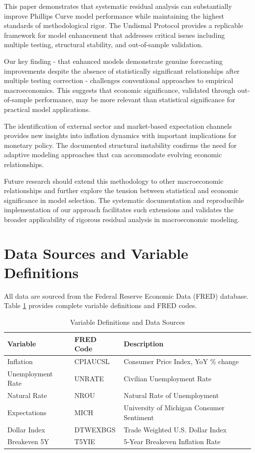 \documentclass[12pt]{article}
\begin{document}
This paper demonstrates that systematic residual analysis can substantially improve Phillips Curve model performance while maintaining the highest standards of methodological rigor. The Undismal Protocol provides a replicable framework for model enhancement that addresses critical issues including multiple testing, structural stability, and out-of-sample validation.

Our key finding - that enhanced models demonstrate genuine forecasting improvements despite the absence of statistically significant relationships after multiple testing correction - challenges conventional approaches to empirical macroeconomics. This suggests that economic significance, validated through out-of-sample performance, may be more relevant than statistical significance for practical model applications.

The identification of external sector and market-based expectation channels provides new insights into inflation dynamics with important implications for monetary policy. The documented structural instability confirms the need for adaptive modeling approaches that can accommodate evolving economic relationships.

Future research should extend this methodology to other macroeconomic relationships and further explore the tension between statistical and economic significance in model selection. The systematic documentation and reproducible implementation of our approach facilitates such extensions and validates the broader applicability of rigorous residual analysis in macroeconomic modeling.




\appendix

\section{Data Sources and Variable Definitions}

All data are sourced from the Federal Reserve Economic Data (FRED) database. Table \ref{tab:variables} provides complete variable definitions and FRED codes.

\begin{table}[H]
\centering
\caption{Variable Definitions and Data Sources}
\label{tab:variables}
\begin{tabular}{lll}
\toprule
Variable & FRED Code & Description \\
\midrule
Inflation & CPIAUCSL & Consumer Price Index, YoY \% change \\
Unemployment Rate & UNRATE & Civilian Unemployment Rate \\
Natural Rate & NROU & Natural Rate of Unemployment \\
Expectations & MICH & University of Michigan Consumer Sentiment \\
Dollar Index & DTWEXBGS & Trade Weighted U.S. Dollar Index \\
Breakeven 5Y & T5YIE & 5-Year Breakeven Inflation Rate \\
\bottomrule
\end{tabular}
\end{table}
\end{document}
